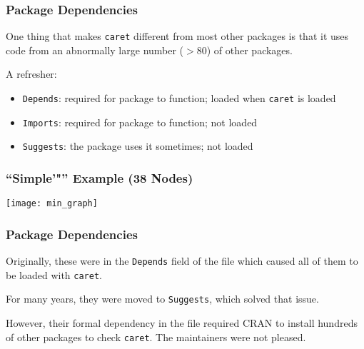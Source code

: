 \documentclass[12 pt]{beamer}\usepackage[]{graphicx}\usepackage[]{color}
\newcommand{\pkg}[1]{{\fontseries{b}\selectfont #1}}
\renewcommand{\pkg}[1]{{\color{darkgreen}\texttt{#1}}}
\begin{document}

  \begin{frame}[fragile]
\frametitle{Package Dependencies}



One thing that makes \pkg{caret} different from most other packages is that it uses code from an abnormally large number ($> 80$) of other packages.

\vspace{.1in}

A refresher:

\begin{itemize}
\item \texttt{Depends}: required for package to function; loaded when \pkg{caret} is loaded
\item \texttt{Imports}: required for package to function; not loaded
\item \texttt{Suggests}: the package uses it sometimes; not loaded
\end{itemize}

\end{frame}



\begin{frame}[fragile]
\frametitle{``Simple'"'' Example (38 Nodes)}
\vspace{-.5in}
  \begin{center}
    \texttt{[image: min\_graph]}
  \end{center}
\end{frame}




\begin{frame}[fragile]
\frametitle{Package Dependencies}


Originally, these were in the \texttt{Depends} field of the  file which caused all of them to be loaded with \pkg{caret}.

\vspace{.15in}

For many years, they were moved to \texttt{Suggests}, which solved that issue.


\vspace{.15in}

However, their formal dependency in the  file required CRAN  to install hundreds of other packages to check  \pkg{caret}. The maintainers were not pleased.

\end{frame}
\end{document}
